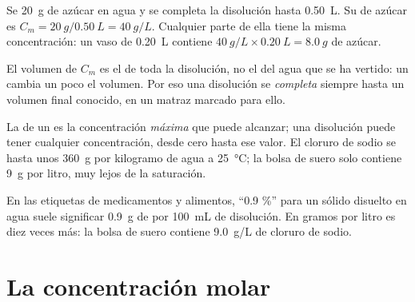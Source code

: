 \begin{example}\label{ex:g10:concentration-and-dilution:sugar}
Se  \qty{20}{g} de azúcar en agua y se completa la disolución
hasta \qty{0.50}{L}. Su  de azúcar es
$C_m = \qty{20}{g} / \qty{0.50}{L} = \qty{40}{g/L}$. Cualquier parte de
ella tiene la misma concentración: un vaso de \qty{0.20}{L} contiene
$\qty{40}{g/L} \times \qty{0.20}{L} = \qty{8.0}{g}$ de azúcar.
\end{example}


\begin{remark}\label{rem:g10:concentration-and-dilution:volume}
El volumen de $C_m$ es el de toda la disolución, no el del agua que se
ha vertido:  un  cambia un poco el volumen. Por eso una
disolución se \emph{completa} siempre hasta un volumen final conocido,
en un matraz marcado para ello.
\end{remark}

\begin{remark}\label{rem:g10:concentration-and-dilution:not-solubility}
La  de un  es la concentración \emph{máxima} que puede
alcanzar; una disolución puede tener cualquier concentración, desde cero
hasta ese valor. El cloruro de sodio se  hasta unos
\qty{360}{g} por kilogramo de agua a \qty{25}{\celsius}; la bolsa de
suero solo contiene \qty{9}{g} por litro, muy lejos de la saturación.
\end{remark}

\begin{remark}\label{rem:g10:concentration-and-dilution:percent}
En las etiquetas de medicamentos y alimentos, ``0.9 \%'' para un sólido
disuelto en agua suele significar \qty{0.9}{g} de  por
\qty{100}{mL} de disolución. En gramos por litro es diez veces más: la
bolsa de suero contiene \qty{9.0}{g/L} de cloruro de sodio.
\end{remark}

\section{La concentración molar}

